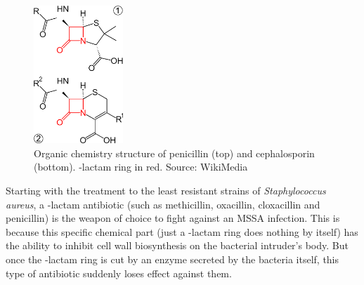 \paragraph{}\begin{figure}\begin{center}\includegraphics[width=0.30\textwidth]{assets/beta-lactam.png}\end{center}\caption{Organic chemistry structure of penicillin (top) and cephalosporin (bottom). \beta-lactam ring in red. Source: WikiMedia}\vspace{-0.30\linewidth}\end{figure}Starting with the treatment to the least resistant strains of \emph{Staphylococcus aureus}, a \beta-lactam antibiotic (such as methicillin, oxacillin, cloxacillin and penicillin) is the weapon of choice to fight against an MSSA infection. This is because this specific chemical part (just a \beta-lactam ring does nothing by itself) has the ability to inhibit cell wall biosynthesis on the bacterial intruder's body. But once the \beta-lactam ring is cut by an enzyme secreted by the bacteria itself, this type of antibiotic suddenly loses effect against them.
